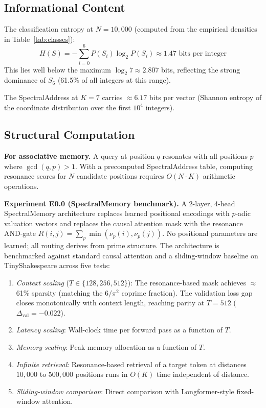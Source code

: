 \documentclass[10pt,twocolumn]{article}
\begin{document}
\subsection{Informational Content}

The classification entropy at $N=10{,}000$ (computed from the empirical
densities in Table~\ref{tab:classes}):
\[
H(S) = -\sum_{i=0}^{6} P(S_i) \log_2 P(S_i)
      \approx 1.47 \text{ bits per integer}
\]
This lies well below the maximum $\log_2 7 \approx 2.807$ bits, reflecting
the strong dominance of $S_6$ (61.5\% of all integers at this range).

The SpectralAddress at $K=7$ carries $\approx 6.17$ bits per vector
(Shannon entropy of the coordinate distribution over the first $10^4$
integers).

\subsection{Structural Computation}\label{subsec:structural}

\textbf{For associative memory.} A query at position $q$ resonates with
all positions $p$ where $\gcd(q,p) > 1$. With a precomputed
SpectralAddress table, computing resonance scores for $N$ candidate
positions requires $O(N \cdot K)$ arithmetic operations.

\noindent\textbf{Experiment E0.0 (SpectralMemory benchmark).}
A 2-layer, 4-head SpectralMemory architecture replaces learned
positional encodings with $p$-adic valuation vectors and replaces the
causal attention mask with the resonance AND-gate
$R(i,j) = \sum_p \min(\nu_p(i), \nu_p(j))$. No positional parameters
are learned; all routing derives from prime structure. The architecture
is benchmarked against standard causal attention and a sliding-window
baseline on TinyShakespeare across five tests:

\begin{enumerate}[noitemsep, topsep=2pt]
\item \emph{Context scaling} ($T \in \{128, 256, 512\}$): The
      resonance-based mask achieves $\approx$61\% sparsity (matching
      the $6/\pi^2$ coprime fraction). The validation loss gap closes
      monotonically with context length, reaching parity at $T=512$
      ($\Delta_{\mathrm{val}} = {-}0.022$).
\item \emph{Latency scaling}: Wall-clock time per forward pass as a
      function of $T$.
\item \emph{Memory scaling}: Peak memory allocation as a function of $T$.
\item \emph{Infinite retrieval}: Resonance-based retrieval of a target
      token at distances $10{,}000$ to $500{,}000$ positions runs in
      $O(K)$ time independent of distance.
\item \emph{Sliding-window comparison}: Direct comparison with
      Longformer-style fixed-window attention.
\end{enumerate}
\end{document}
